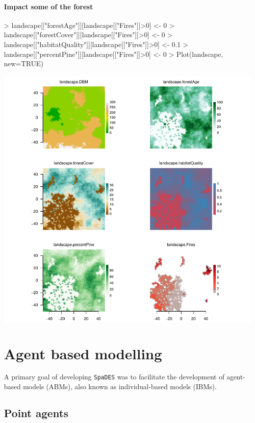 \documentclass{article}
\begin{document}
\paragraph{Impact some of the forest}
\begin{Schunk}
\begin{Sinput}
> landscape[["forestAge"]][landscape[["Fires"]]>0] <- 0
> landscape[["forestCover"]][landscape[["Fires"]]>0] <- 0
> landscape[["habitatQuality"]][landscape[["Fires"]]>0] <- 0.1
> landscape[["percentPine"]][landscape[["Fires"]]>0] <- 0
> Plot(landscape, new=TRUE)
\end{Sinput}
\end{Schunk}
\includegraphics{introduction-fire-impacts-maps}

\newpage

\section{Agent based modelling}
A primary goal of developing \texttt{SpaDES} was to facilitate the development of agent-based models (ABMs), also known as individual-based models (IBMs).

\subsection{Point agents}
\end{document}
